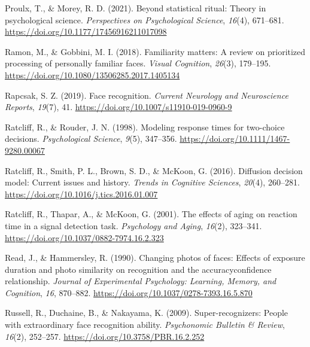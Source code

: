 \documentclass[
  letterpaper,
  DIV=11,
  numbers=noendperiod]{scrartcl}
\newlength{\cslhangindent}
\newenvironment{CSLReferences}[2] %
 {\begin{list}{}{%
  \setlength{\itemindent}{0pt}
  \setlength{\leftmargin}{0pt}
  \setlength{\parsep}{0pt}
  \ifodd #1
   \setlength{\leftmargin}{\cslhangindent}
   \setlength{\itemindent}{-1\cslhangindent}
  \fi
  \setlength{\itemsep}{#2\baselineskip}}}
 {\end{list}}
\begin{document}
\begin{CSLReferences}{1}{0}
Proulx, T., \& Morey, R. D. (2021). Beyond statistical ritual: Theory in
psychological science. \emph{Perspectives on Psychological Science},
\emph{16}(4), 671--681. \url{https://doi.org/10.1177/17456916211017098}

Ramon, M., \& Gobbini, M. I. (2018). Familiarity matters: A review on
prioritized processing of personally familiar faces. \emph{Visual
Cognition}, \emph{26}(3), 179--195.
\url{https://doi.org/10.1080/13506285.2017.1405134}

Rapcsak, S. Z. (2019). Face recognition. \emph{Current Neurology and
Neuroscience Reports}, \emph{19}(7), 41.
\url{https://doi.org/10.1007/s11910-019-0960-9}

Ratcliff, R., \& Rouder, J. N. (1998). Modeling response times for
two-choice decisions. \emph{Psychological Science}, \emph{9}(5),
347--356. \url{https://doi.org/10.1111/1467-9280.00067}

Ratcliff, R., Smith, P. L., Brown, S. D., \& McKoon, G. (2016).
Diffusion decision model: Current issues and history. \emph{Trends in
Cognitive Sciences}, \emph{20}(4), 260--281.
\url{https://doi.org/10.1016/j.tics.2016.01.007}

Ratcliff, R., Thapar, A., \& McKoon, G. (2001). The effects of aging on
reaction time in a signal detection task. \emph{Psychology and Aging},
\emph{16}(2), 323--341. \url{https://doi.org/10.1037/0882-7974.16.2.323}

Read, J., \& Hammersley, R. (1990). Changing photos of faces: Effects of
exposure duration and photo similarity on recognition and the
accuracy{\textendash}confidence relationship. \emph{Journal of
Experimental Psychology: Learning, Memory, and Cognition}, \emph{16},
870--882. \url{https://doi.org/10.1037/0278-7393.16.5.870}

Russell, R., Duchaine, B., \& Nakayama, K. (2009). Super-recognizers:
People with extraordinary face recognition ability. \emph{Psychonomic
Bulletin \& Review}, \emph{16}(2), 252--257.
\url{https://doi.org/10.3758/PBR.16.2.252}


\end{CSLReferences}
\end{document}
